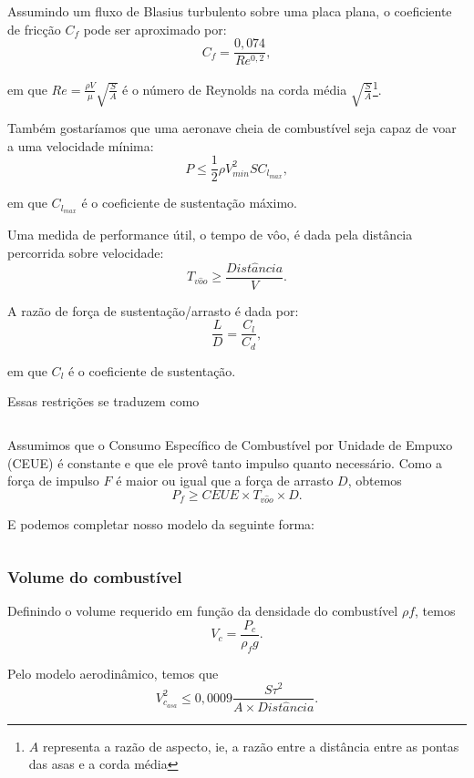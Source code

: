 \documentclass{article}
\begin{document}
Assumindo um fluxo de Blasius turbulento sobre uma placa plana, o
coeficiente de fricção $C_f$ pode ser aproximado por:
\[
  C_f = \frac{0,074}{Re^{0,2}},
\]

\noindent em que $Re = \frac{\rho V}{\mu}\sqrt{\frac{S}{A}}$ é o
número de Reynolds na corda média $\sqrt{\frac{S}{A}}$\footnote{$A$
  representa a razão de aspecto, ie, a razão entre a distância entre
  as pontas das asas e a corda média}.

Também gostaríamos que uma aeronave cheia de combustível seja capaz de
voar a uma velocidade mínima:
\[
  P \leq \frac{1}{2}\rho V_{min}^{2} S C_{l_{max}},
\]

\noindent em que $C_{l_{max}}$ é o coeficiente de sustentação máximo.

Uma medida de performance útil, o tempo de vôo, é dada pela distância
percorrida sobre velocidade:
\[
  T_{v\hat{o}o} \geq \frac{Dist\hat{a}ncia}{V}.
\]

A razão de força de sustentação/arrasto é dada por:
\[
  \frac{L}{D} = \frac{C_l}{C_d},
\]

\noindent em que $C_l$ é o coeficiente de sustentação.

Essas restrições se traduzem como

\inputminted{python}{../Exemplos/Cap15/prog1_wlm.py}


Assumimos que o Consumo Específico de Combustível por Unidade de
Empuxo (CEUE) é constante e que ele provê tanto impulso quanto
necessário. Como a força de impulso $F$ é maior ou igual que a força
de arrasto $D$, obtemos
\[
  P_f \geq CEUE \times T_{v\hat{o}o} \times D.
\]

E podemos completar nosso modelo da seguinte forma:

\inputminted{python}{../Exemplos/Cap15/prog2_tdm.py}

\subsubsection{Volume do combustível}

Definindo o volume requerido em função da densidade do combustível
$\rho f$, temos
\[
  V_c = \frac{P_c}{\rho_f g}.
\]

Pelo modelo aerodinâmico, temos que
\[
  V_{c_{asa}}^2 \leq 0,0009\frac{S\tau^2}{A \times Dist\hat{a}ncia}.
\]
\end{document}
